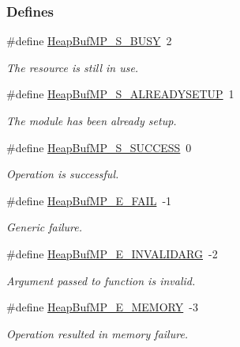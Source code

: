 \subsubsection*{Defines}
\begin{DoxyCompactItemize}
\item 
\#define \hyperlink{_heap_buf_m_p_8h_ae1b0ea5865b0687653171ad2bf3d17b3}{HeapBufMP\_\-S\_\-BUSY}~2
\begin{DoxyCompactList}\small\item\em The resource is still in use. \item\end{DoxyCompactList}\item 
\#define \hyperlink{_heap_buf_m_p_8h_a8d7ddf7f2176ffd9e11dad5d32545ebb}{HeapBufMP\_\-S\_\-ALREADYSETUP}~1
\begin{DoxyCompactList}\small\item\em The module has been already setup. \item\end{DoxyCompactList}\item 
\#define \hyperlink{_heap_buf_m_p_8h_ab98593be8c8588e512f38265b4d185f0}{HeapBufMP\_\-S\_\-SUCCESS}~0
\begin{DoxyCompactList}\small\item\em Operation is successful. \item\end{DoxyCompactList}\item 
\#define \hyperlink{_heap_buf_m_p_8h_afe559bb52af4c143c559d3ca44654520}{HeapBufMP\_\-E\_\-FAIL}~-\/1
\begin{DoxyCompactList}\small\item\em Generic failure. \item\end{DoxyCompactList}\item 
\#define \hyperlink{_heap_buf_m_p_8h_a3bd067e1c23ed6c94aad604e5a74244d}{HeapBufMP\_\-E\_\-INVALIDARG}~-\/2
\begin{DoxyCompactList}\small\item\em Argument passed to function is invalid. \item\end{DoxyCompactList}\item 
\#define \hyperlink{_heap_buf_m_p_8h_a7dff5751dc8d83830b7ad130d0e6fe86}{HeapBufMP\_\-E\_\-MEMORY}~-\/3
\begin{DoxyCompactList}\small\item\em Operation resulted in memory failure. \item\end{DoxyCompactList}\item 

\end{DoxyCompactItemize}
